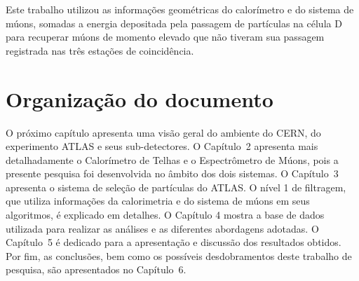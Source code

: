 Este trabalho utilizou as informações geométricas do calorímetro e do sistema de
múons, somadas a energia depositada pela passagem de partículas na célula D para
recuperar múons de momento elevado que não tiveram sua passagem registrada nas
três estações de coincidência.

\section{Organização do documento}

O próximo capítulo apresenta uma visão geral do ambiente do CERN, do experimento
ATLAS e seus sub-detectores.  O Capítulo~2 apresenta mais detalhadamente o
Calorímetro de Telhas e o Espectrômetro de Múons, pois a presente pesquisa foi
desenvolvida no âmbito dos dois sistemas.  O Capítulo~3 apresenta o sistema de
seleção de partículas do ATLAS. O nível 1 de filtragem, que utiliza informações
da calorimetria e do sistema de múons em seus algoritmos, é explicado em
detalhes. O Capítulo 4 mostra a base de dados utilizada para realizar as
análises e as diferentes abordagens adotadas. O Capítulo~5  é dedicado para a
apresentação e discussão dos resultados obtidos.   Por fim, as conclusões, bem
como os possíveis desdobramentos deste trabalho de pesquisa, são apresentados no
Capítulo~6.

